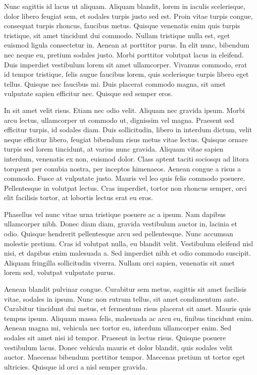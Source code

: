 Nunc sagittis id lacus ut aliquam. Aliquam blandit, lorem in iaculis scelerisque, dolor libero feugiat sem, et sodales turpis justo sed est. Proin vitae turpis congue, consequat turpis rhoncus, faucibus metus. Quisque venenatis enim quis turpis tristique, sit amet tincidunt dui commodo. Nullam tristique nulla est, eget euismod ligula consectetur in. Aenean at porttitor purus. In elit nunc, bibendum nec neque eu, pretium sodales justo. Morbi porttitor volutpat lacus in eleifend. Duis imperdiet vestibulum lorem sit amet ullamcorper. Vivamus commodo, erat id tempor tristique, felis augue faucibus lorem, quis scelerisque turpis libero eget tellus. Quisque nec faucibus mi. Duis placerat commodo magna, sit amet vulputate sapien efficitur nec. Quisque sed semper eros.

In sit amet velit risus. Etiam nec odio velit. Aliquam nec gravida ipsum. Morbi arcu lectus, ullamcorper ut commodo ut, dignissim vel magna. Praesent sed efficitur turpis, id sodales diam. Duis sollicitudin, libero in interdum dictum, velit neque efficitur libero, feugiat bibendum risus metus vitae lectus. Quisque ornare turpis sed lorem tincidunt, at varius nunc gravida. Aliquam vitae sapien interdum, venenatis ex non, euismod dolor. Class aptent taciti sociosqu ad litora torquent per conubia nostra, per inceptos himenaeos. Aenean congue a risus a commodo. Fusce at vulputate justo. Mauris vel leo quis felis commodo posuere. Pellentesque in volutpat lectus. Cras imperdiet, tortor non rhoncus semper, orci elit facilisis tortor, at lobortis lectus erat eu eros.

Phasellus vel nunc vitae urna tristique posuere ac a ipsum. Nam dapibus ullamcorper nibh. Donec diam diam, gravida vestibulum auctor in, lacinia et odio. Quisque hendrerit pellentesque arcu sed pellentesque. Nunc accumsan molestie pretium. Cras id volutpat nulla, eu blandit velit. Vestibulum eleifend nisl nisi, et dapibus enim malesuada a. Sed imperdiet nibh et odio commodo suscipit. Aliquam fringilla sollicitudin viverra. Nullam orci sapien, venenatis sit amet lorem sed, volutpat vulputate purus.

Aenean blandit pulvinar congue. Curabitur sem metus, sagittis sit amet facilisis vitae, sodales in ipsum. Nunc non rutrum tellus, sit amet condimentum ante. Curabitur tincidunt dui metus, et fermentum risus placerat sit amet. Mauris quis tempus ipsum. Aliquam massa felis, malesuada ac arcu eu, finibus tincidunt enim. Aenean magna mi, vehicula nec tortor eu, interdum ullamcorper enim. Sed sodales sit amet nisi id tempor. Praesent in lectus risus. Quisque posuere vestibulum lacus. Donec vehicula mauris et dolor blandit, quis sodales velit auctor. Maecenas bibendum porttitor tempor. Maecenas pretium ut tortor eget ultricies. Quisque id orci a nisl semper gravida.


